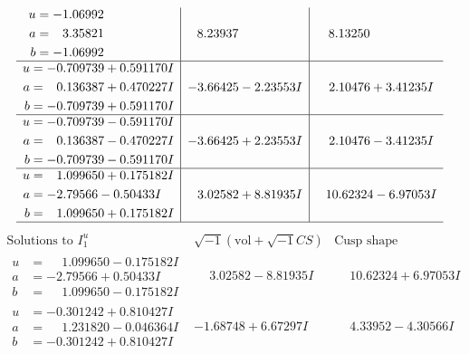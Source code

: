 \documentclass[1p]{elsarticle_modified}
\theoremstyle{definition}
\newcommand{\I}{\sqrt{-1}}
\begin{document}
$$\begin{array}{c|c|c}
\begin{aligned}
u &= -1.06992\phantom{ +0.000000I} \\
a &= \phantom{-}3.35821\phantom{ +0.000000I} \\
b &= -1.06992\phantom{ +0.000000I}\end{aligned}
 & \phantom{-}8.23937\phantom{ +0.000000I} & \phantom{-}8.13250\phantom{ +0.000000I} \\ \hline\begin{aligned}
u &= -0.709739 + 0.591170 I \\
a &= \phantom{-}0.136387 + 0.470227 I \\
b &= -0.709739 + 0.591170 I\end{aligned}
 & -3.66425 - 2.23553 I & \phantom{-}2.10476 + 3.41235 I \\ \hline\begin{aligned}
u &= -0.709739 - 0.591170 I \\
a &= \phantom{-}0.136387 - 0.470227 I \\
b &= -0.709739 - 0.591170 I\end{aligned}
 & -3.66425 + 2.23553 I & \phantom{-}2.10476 - 3.41235 I \\ \hline\begin{aligned}
u &= \phantom{-}1.099650 + 0.175182 I \\
a &= -2.79566 - 0.50433 I \\
b &= \phantom{-}1.099650 + 0.175182 I\end{aligned}
 & \phantom{-}3.02582 + 8.81935 I & \phantom{-}10.62324 - 6.97053 I\\
 \hline 
 \end{array}$$\newpage$$\begin{array}{c|c|c}  
\text{Solutions to }I^u_{1}& \I (\text{vol} + \sqrt{-1}CS) & \text{Cusp shape}\\
 \hline 
\begin{aligned}
u &= \phantom{-}1.099650 - 0.175182 I \\
a &= -2.79566 + 0.50433 I \\
b &= \phantom{-}1.099650 - 0.175182 I\end{aligned}
 & \phantom{-}3.02582 - 8.81935 I & \phantom{-}10.62324 + 6.97053 I \\ \hline\begin{aligned}
u &= -0.301242 + 0.810427 I \\
a &= \phantom{-}1.231820 - 0.046364 I \\
b &= -0.301242 + 0.810427 I\end{aligned}
 & -1.68748 + 6.67297 I & \phantom{-}4.33952 - 4.30566 I \\ \hline\begin{aligned}

\end{aligned}
\end{array}$$
\end{document}
